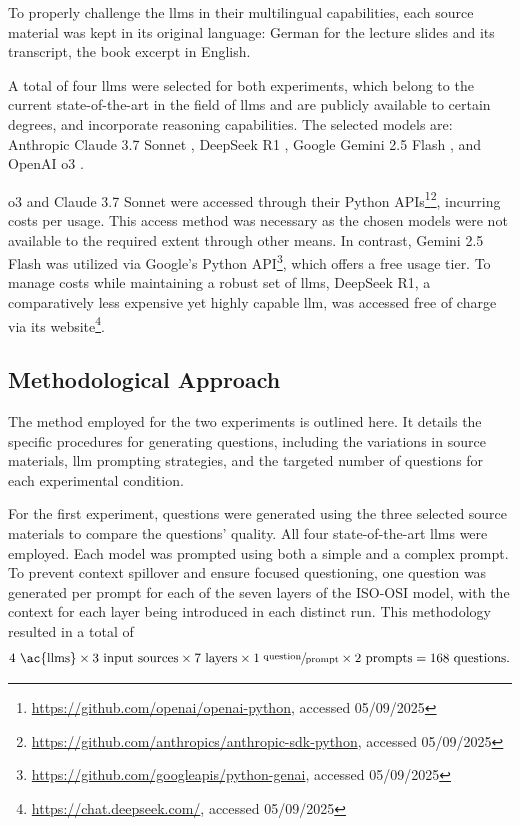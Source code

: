 \pagebreak

To properly challenge the \ac{llms} in their multilingual capabilities, each source material was kept in its original language: German for the lecture slides and its transcript, the book excerpt in English.


 A total of four \ac{llms} were selected for both experiments, which belong to the current state-of-the-art in the field of \ac{llms} and are publicly available to certain degrees, and incorporate reasoning capabilities. The selected models are:
Anthropic Claude 3.7 Sonnet \cite{anthropic_claude_2025},
    DeepSeek R1 \cite{deepseek-ai_deepseek-r1_2025},
    Google Gemini 2.5 Flash \cite{kavukcuoglu_gemini_2025}, and
    OpenAI o3 \cite{openai_openai_2025-1}.

\vspace{1em}

o3 and Claude 3.7 Sonnet were accessed through their Python APIs\footnote{\label{fn:openai-api}\url{https://github.com/openai/openai-python}, accessed 05/09/2025}\footnote{\label{fn:anthropic-api}\url{https://github.com/anthropics/anthropic-sdk-python}, accessed 05/09/2025}, incurring costs per usage. This access method was necessary as the chosen models were not available to the required extent through other means. In contrast, Gemini 2.5 Flash was utilized via Google's Python API\footnote{\label{fn:google-api}\url{https://github.com/googleapis/python-genai}, accessed 05/09/2025}, which offers a free usage tier. To manage costs while maintaining a robust set of \ac{llms}, DeepSeek R1, a comparatively less expensive yet highly capable \ac{llm}, was accessed free of charge via its website\footnote{\label{fn:deepseek}\url{https://chat.deepseek.com/}, accessed 05/09/2025}.

\subsection{Methodological Approach}
\label{sec:methodological-approach}

The method employed for the two experiments is outlined here. It details the specific procedures for generating questions, including the variations in source materials, \ac{llm} prompting strategies, and the targeted number of questions for each experimental condition.

 For the first experiment, questions were generated using the three selected source materials to compare the questions' quality. All four state-of-the-art \ac{llms} were employed. Each model was prompted using both a simple and a complex prompt. To prevent context spillover and ensure focused questioning, one question was generated per prompt for each of the seven layers of the ISO-OSI model, with the context for each layer being introduced in each distinct run. This methodology resulted in a total of
 \begin{align}4 \text{ \ac{llms}} \times 3 \text{ input sources} \times 7 \text{ layers} \times 1 \sfrac{\text{ question}}{\text{prompt}} \times 2 \text{ prompts} = 168 \text{ questions.}\end{align}

